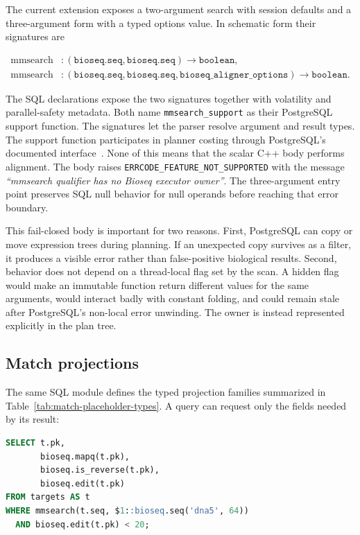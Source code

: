 The current extension exposes a two-argument search with session defaults and
a three-argument form with a typed options value.  In schematic form their
signatures are

\[
\begin{aligned}
  \operatorname{mmsearch} &: (\texttt{bioseq.seq},
      \texttt{bioseq.seq}) \rightarrow \texttt{boolean},\\
  \operatorname{mmsearch} &: (\texttt{bioseq.seq},
      \texttt{bioseq.seq},
      \texttt{bioseq\_aligner\_options}) \rightarrow
      \texttt{boolean}.
\end{aligned}
\]

The SQL declarations expose the two signatures together with volatility and
parallel-safety metadata.  Both name \texttt{mmsearch\_support} as their
PostgreSQL support function.  The signatures let the parser resolve argument
and result types.  The support function participates in planner costing
through PostgreSQL's documented interface~\cite{postgresql17_support_functions}.
None of this means that the scalar C++ body performs alignment.  The body raises
\texttt{ERRCODE\_FEATURE\_NOT\_SUPPORTED} with the message
\emph{``mmsearch qualifier has no Bioseq executor owner''}.  The three-argument
entry point preserves SQL null behavior for null operands before reaching that
error boundary.

This fail-closed body is important for two reasons.  First, PostgreSQL can
copy or move expression trees during planning.  If an unexpected copy
survives as a filter, it produces a visible error rather than false-positive
biological results.  Second, behavior does not depend on a thread-local flag
set by the scan.  A hidden flag would make an immutable function return
different values for the same arguments, would interact badly with constant
folding, and could remain stale after PostgreSQL's non-local error unwinding.
The owner is instead represented explicitly in the plan tree.

\subsection{Match projections}

The same SQL module defines the typed projection families summarized in
Table~\ref{tab:match-placeholder-types}.  A query can request only the fields
needed by its result:

\begin{lstlisting}[language=SQL]
SELECT t.pk,
       bioseq.mapq(t.pk),
       bioseq.is_reverse(t.pk),
       bioseq.edit(t.pk)
FROM targets AS t
WHERE mmsearch(t.seq, $1::bioseq.seq('dna5', 64))
  AND bioseq.edit(t.pk) < 20;
\end{lstlisting}


